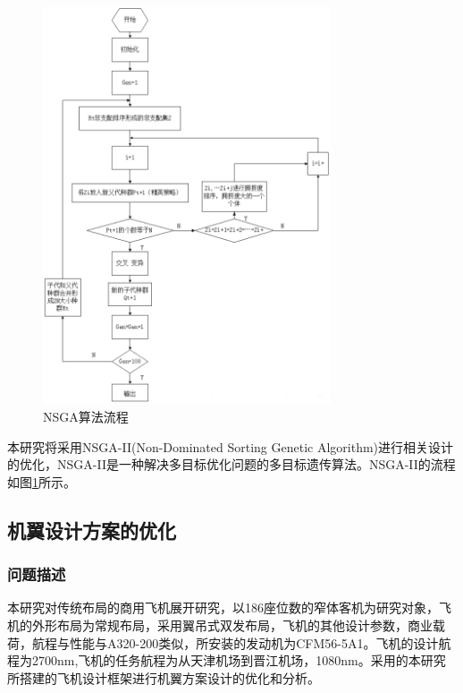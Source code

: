 \documentclass[12pt,a4paper]{report}
\begin{document}
\begin{figure}[ht!]
	\centering
		\includegraphics[width=3.35in,height=4.62in]{./media4/image7.png}
		\caption{NSGA算法流程}
		\label{fig:g41_NSGA}
\end{figure}


本研究将采用NSGA-II(Non-Dominated Sorting Genetic Algorithm)进行相关设计的优化，NSGA-II是一种解决多目标优化问题的多目标遗传算法。NSGA-II的流程如图\ref{fig:g41_NSGA}所示。

\subsection{机翼设计方案的优化}
\subsubsection{问题描述}
本研究对传统布局的商用飞机展开研究，以186座位数的窄体客机为研究对象，飞机的外形布局为常规布局，采用翼吊式双发布局，飞机的其他设计参数，商业载荷，航程与性能与A320-200类似，所安装的发动机为CFM56-5A1。飞机的设计航程为2700nm,飞机的任务航程为从天津机场到晋江机场，1080nm。采用的本研究所搭建的飞机设计框架进行机翼方案设计的优化和分析。
\end{document}
